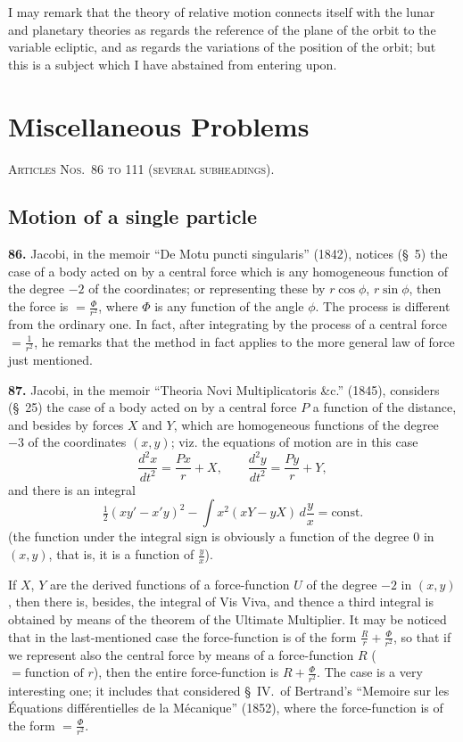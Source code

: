 \documentclass[11pt,a4paper]{book}
\begin{document}
I may remark that the theory of relative motion connects itself with the lunar and planetary theories as regards the reference of the plane of the orbit to the variable ecliptic, and as regards the variations of the position of the orbit; but this is a subject which I have abstained from entering upon.


\section*{Miscellaneous Problems}
\noindent\textsc{Articles Nos.~86 to 111 (several subheadings).}

\subsection*{Motion of a single particle}

\textbf{86.} Jacobi, in the memoir ``De Motu puncti singularis'' (1842), notices (\S~5) the case of a body acted on by a central force which is any homogeneous function of the degree $-2$ of the coordinates; or representing these by $r\cos\phi$, $r\sin\phi$, then the force is $= \frac{\Phi}{r^2}$, where $\Phi$ is any function of the angle $\phi$. The process is different from the ordinary one. In fact, after integrating by the process of a central force $= \frac{1}{r^2}$, he remarks that the method in fact applies to the more general law of force just mentioned.

\textbf{87.} Jacobi, in the memoir ``Theoria Novi Multiplicatoris \&c.'' (1845), considers (\S~25) the case of a body acted on by a central force $P$ a function of the distance, and besides by forces $X$ and $Y$, which are homogeneous functions of the degree $-3$ of the coordinates $(x, y)$; viz. the equations of motion are in this case
\[
\frac{d^2x}{dt^2} = \frac{Px}{r} + X, \qquad \frac{d^2y}{dt^2} = \frac{Py}{r} + Y,
\]
and there is an integral
\[
\tfrac{1}{2}(xy' - x'y)^2 - \int x^2(xY - yX)\,d\frac{y}{x} = \text{const.}
\]
(the function under the integral sign is obviously a function of the degree 0 in $(x, y)$, that is, it is a function of $\frac{y}{x}$).

If $X$, $Y$ are the derived functions of a force-function $U$ of the degree $-2$ in $(x, y)$, then there is, besides, the integral of Vis Viva, and thence a third integral is obtained by means of the theorem of the Ultimate Multiplier. It may be noticed that in the last-mentioned case the force-function is of the form $\frac{R}{r} + \frac{\Phi}{r^2}$, so that if we represent also the central force by means of a force-function $R$ ($= \text{function of } r$), then the entire force-function is $R + \frac{\Phi}{r^2}$. The case is a very interesting one; it includes that considered \S~IV.\ of Bertrand's ``Memoire sur les \'Equations diff\'erentielles de la M\'ecanique'' (1852), where the force-function is of the form $= \frac{\Phi}{r^2}$.
\end{document}
